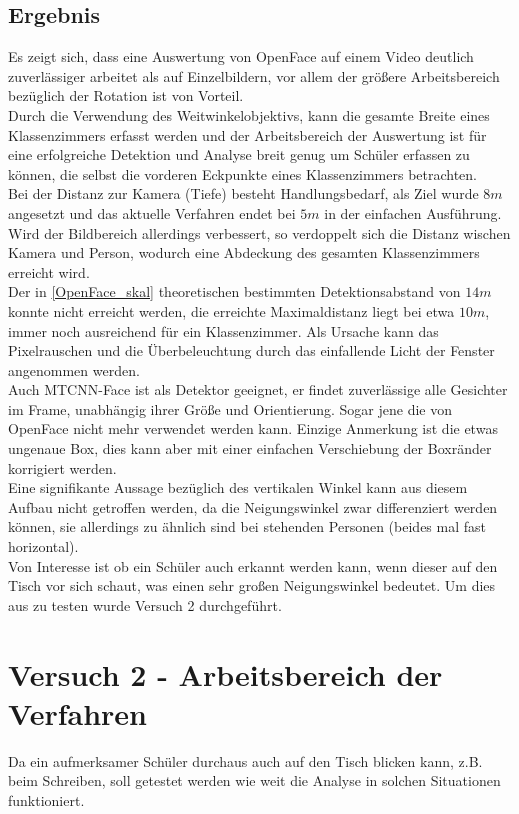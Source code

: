 \subsection{Ergebnis}
Es zeigt sich, dass eine Auswertung von OpenFace auf einem Video deutlich zuverlässiger arbeitet als auf Einzelbildern, vor allem der größere Arbeitsbereich bezüglich der Rotation ist von Vorteil.\\
Durch die Verwendung des Weitwinkelobjektivs, kann die gesamte Breite eines Klassenzimmers erfasst werden und der Arbeitsbereich der Auswertung ist für eine erfolgreiche Detektion und Analyse breit genug um Schüler erfassen zu können, die selbst die vorderen Eckpunkte eines Klassenzimmers betrachten.\\
Bei der Distanz zur Kamera (Tiefe) besteht Handlungsbedarf, als Ziel wurde $8m$ angesetzt und das aktuelle Verfahren endet bei $5m$ in der einfachen Ausführung. Wird der Bildbereich allerdings verbessert, so verdoppelt sich die Distanz wischen Kamera und Person, wodurch eine Abdeckung des gesamten Klassenzimmers erreicht wird.\\
Der in \autoref{OpenFace_skal} theoretischen bestimmten Detektionsabstand von $14m$ konnte nicht erreicht werden, die erreichte Maximaldistanz liegt bei etwa $10m$, immer noch ausreichend für ein Klassenzimmer. Als Ursache kann das Pixelrauschen und die Überbeleuchtung durch das einfallende Licht der Fenster angenommen werden.\\
Auch MTCNN-Face ist als Detektor geeignet, er findet zuverlässige alle Gesichter im Frame, unabhängig ihrer Größe und Orientierung. Sogar jene die von OpenFace nicht mehr verwendet werden kann. Einzige Anmerkung ist die etwas ungenaue Box, dies kann aber mit einer einfachen Verschiebung der Boxränder korrigiert werden.\\
Eine signifikante Aussage bezüglich des vertikalen Winkel kann aus diesem Aufbau nicht getroffen werden, da die Neigungswinkel zwar differenziert werden können, sie allerdings zu ähnlich sind bei stehenden Personen (beides mal fast horizontal).\\
Von Interesse ist ob ein Schüler auch erkannt werden kann, wenn dieser auf den Tisch vor sich schaut, was einen sehr großen Neigungswinkel bedeutet. Um dies aus zu testen wurde Versuch 2 durchgeführt.
\section{Versuch 2 - Arbeitsbereich der Verfahren}
Da ein aufmerksamer Schüler durchaus auch auf den Tisch blicken kann, z.B. beim Schreiben, soll getestet werden wie weit die Analyse in solchen Situationen funktioniert.
